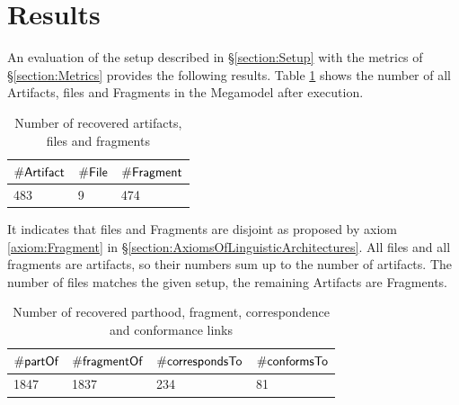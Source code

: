 \section{Results}
\label{section:Results}
An evaluation of the setup described in §\ref{section:Setup} with the metrics of §\ref{section:Metrics} provides the following results.
Table \ref{table:NumberOfRecoveredArtifactsFilesAndFragments} shows the number of all \glspl{Artifact}, files and \glspl{Fragment} in the \gls{Megamodel} after execution.
\begin{table}[h!]
\begin{center}
\begin{tabular}{|l|l|l|}
\hline
$\#\textsf{Artifact}$ & $\#\textsf{File}$ & $\#\textsf{Fragment}$
\\ \hline
483 & 9 & 474 
\\ \hline
\end{tabular}
\end{center}
\caption{Number of recovered artifacts, files and fragments}
\label{table:NumberOfRecoveredArtifactsFilesAndFragments}
\end{table}
It indicates that files and \glspl{Fragment} are disjoint as proposed by axiom \ref{axiom:Fragment} in §\ref{section:AxiomsOfLinguisticArchitectures}.
All files and all fragments are artifacts, so their numbers sum up to the number of artifacts.
The number of files matches the given setup, the remaining \glspl{Artifact} are \glspl{Fragment}.

\begin{table}[h!]
\begin{center}
\begin{tabular}{|l|l|l|l|}
\hline
$\#\textsf{partOf}$ & $\#\textsf{fragmentOf}$ & $\#\textsf{correspondsTo}$ & $\#\textsf{conformsTo}$
\\ \hline
1847 & 1837 & 234 & 81 
\\ \hline
\end{tabular}
\end{center}
\caption{Number of recovered parthood, fragment, correspondence and conformance links}
\label{table:NumberOfRecoveredParthoodFragmentCorrespondenceAndConformanceLinks}
\end{table}

